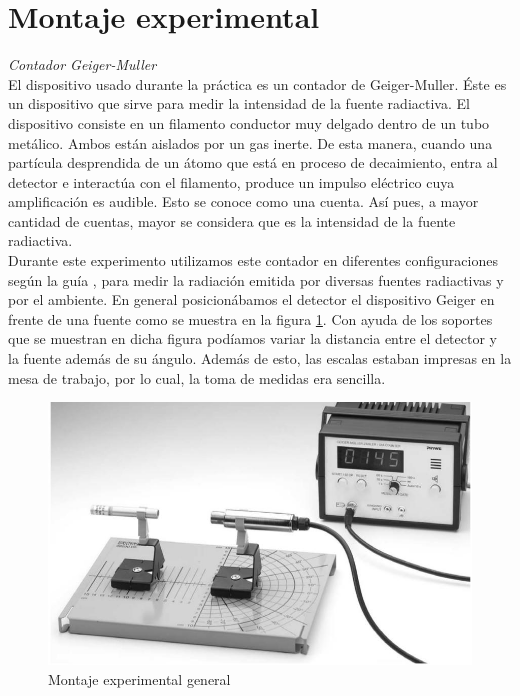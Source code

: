 \documentclass[%
 reprint,
 amsmath,amssymb,
 aps,
]{revtex4-1}
\begin{document}
\section{\label{sec:level1}Montaje experimental}
\textit{Contador Geiger-Muller}\\

El dispositivo usado durante la práctica es un contador de Geiger-Muller. Éste es un dispositivo que sirve para medir la intensidad de la fuente radiactiva. El dispositivo consiste en un filamento conductor muy delgado dentro de un tubo metálico. Ambos están aislados por un gas inerte. De esta manera, cuando una partícula desprendida de un átomo que está en proceso de decaimiento, entra al detector e interactúa con el filamento, produce un impulso eléctrico cuya amplificación es audible. Esto se conoce como una cuenta. Así pues, a mayor cantidad de cuentas, mayor se considera que es la intensidad de la fuente radiactiva.\\

Durante este experimento utilizamos este contador en diferentes configuraciones según la guía \cite{guia}, para medir la radiación emitida por diversas fuentes radiactivas y por el ambiente. En general posicionábamos el detector el dispositivo Geiger en frente de una fuente como se muestra en la figura \ref{fig:montaje}. Con ayuda de los soportes que se muestran en dicha figura podíamos variar la distancia entre el detector y la fuente además de su ángulo. Además de esto, las escalas estaban impresas en la mesa de trabajo, por lo cual, la toma de medidas era sencilla.\\

\begin{figure}[h!]
\centering
\includegraphics[width=1\linewidth]{montaje.jpg}
\caption{Montaje experimental general}
\label{fig:montaje}
\end{figure}
\end{document}
